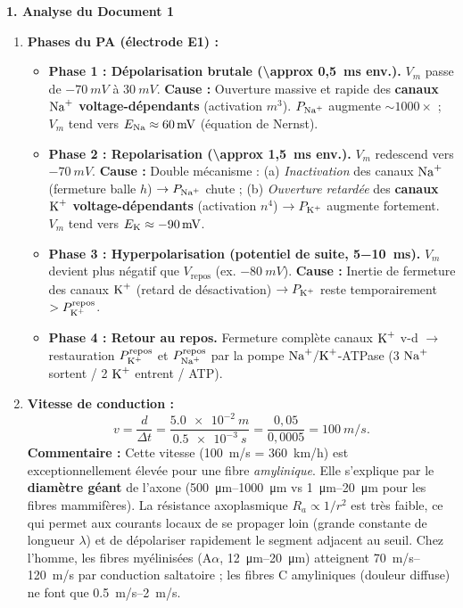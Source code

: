 \documentclass[11pt]{article}
\begin{document}
\begin{exoresolu}
\tcblower
\textbf{1. Analyse du Document 1}
\begin{enumerate}
    \item \textbf{Phases du PA (électrode E1) :}
    \begin{itemize}
        \item \textbf{Phase 1 : Dépolarisation brutale (\SI{\approx 0,5}{ms} env.).} $V_m$ passe de $\SI{-70}{mV}$ à $\SI{+30}{mV}$. \textbf{Cause :} Ouverture massive et rapide des \textbf{canaux $\ce{Na+}$ voltage-dépendants} (activation $m^3$). $P_{\ce{Na+}}$ augmente $\sim 1000\times$ ; $V_m$ tend vers $E_{\ce{Na}} \approx \SI{+60}{mV}$ (équation de Nernst).
        \item \textbf{Phase 2 : Repolarisation (\SI{\approx 1,5}{ms} env.).} $V_m$ redescend vers $\SI{-70}{mV}$. \textbf{Cause :} Double mécanisme : (a) \emph{Inactivation} des canaux $\ce{Na+}$ (fermeture balle $h$) $\rightarrow P_{\ce{Na+}}$ chute ; (b) \emph{Ouverture retardée} des \textbf{canaux $\ce{K+}$ voltage-dépendants} (activation $n^4$) $\rightarrow P_{\ce{K+}}$ augmente fortement. $V_m$ tend vers $E_{\ce{K}} \approx \SI{-90}{mV}$.
        \item \textbf{Phase 3 : Hyperpolarisation (potentiel de suite, \SI{5-10}{ms}).} $V_m$ devient plus négatif que $V_{\text{repos}}$ (ex. $\SI{-80}{mV}$). \textbf{Cause :} Inertie de fermeture des canaux $\ce{K+}$ (retard de désactivation) $\rightarrow P_{\ce{K+}}$ reste temporairement $> P_{\ce{K+}}^{\text{repos}}$.
        \item \textbf{Phase 4 : Retour au repos.} Fermeture complète canaux $\ce{K+}$ v-d $\rightarrow$ restauration $P_{\ce{K+}}^{\text{repos}}$ et $P_{\ce{Na+}}^{\text{repos}}$ par la pompe $\ce{Na+/K+}$-ATPase (3 $\ce{Na+}$ sortent / 2 $\ce{K+}$ entrent / ATP).
    \end{itemize}
    \item \textbf{Vitesse de conduction :}
    \[
    v = \frac{d}{\Delta t} = \frac{\SI{5,0e-2}{m}}{\SI{0,5e-3}{s}} = \frac{0,05}{0,0005} = \SI{100}{m/s}.
    \]
    \textbf{Commentaire :} Cette vitesse (\SI{100}{m/s} = \SI{360}{km/h}) est exceptionnellement élevée pour une fibre \emph{amylinique}. Elle s'explique par le \textbf{diamètre géant} de l'axone (\SIrange{500}{1000}{\micro\meter} vs \SIrange{1}{20}{\micro\meter} pour les fibres mammifères). La résistance axoplasmique $R_a \propto 1/r^2$ est très faible, ce qui permet aux courants locaux de se propager loin (grande constante de longueur $\lambda$) et de dépolariser rapidement le segment adjacent au seuil. Chez l'homme, les fibres myélinisées (A$\alpha$, \SIrange{12}{20}{\micro\meter}) atteignent \SIrange{70}{120}{m/s} par conduction saltatoire ; les fibres C amyliniques (douleur diffuse) ne font que \SIrange{0,5}{2}{m/s}.

\end{enumerate}
\end{exoresolu}
\end{document}
